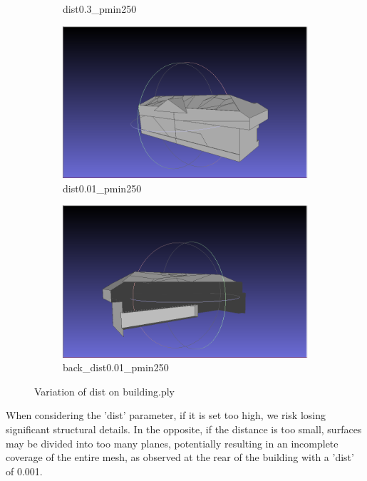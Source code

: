 \documentclass{article}
\begin{document}
\begin{figure}[H]
\begin{subfigure}[b]{0.45\textwidth}
      \caption{dist0.3\_pmin250}
      \label{fig:dist0.3_pmin250}
    \end{subfigure}
    \hfill
    \begin{subfigure}[b]{0.45\textwidth}
      \includegraphics[width=\textwidth]{../../images/screen_kinetic/dist_001_pmin_250.png}
      \caption{dist0.01\_pmin250}
      \label{fig:dist0.01_pmin300}
    \end{subfigure}
    \vfill
    \begin{subfigure}[b]{0.45\textwidth}
      \includegraphics[width=\textwidth]{../../images/screen_kinetic/back_dist001_pmin250.png}
      \caption{back\_dist0.01\_pmin250}
      \label{fig:back_dist0.01_pmin250}
    \end{subfigure}
    \caption{Variation of dist on building.ply}
    \label{fig:variation_pmin}
\end{figure}

  When considering the 'dist' parameter, if it is set too high, we risk losing significant structural details. 
  In the opposite, if the distance is too small, surfaces may be divided into too many planes, potentially resulting in an incomplete coverage of the entire mesh, 
  as observed at the rear of the building with a 'dist' of 0.001.
\end{document}
